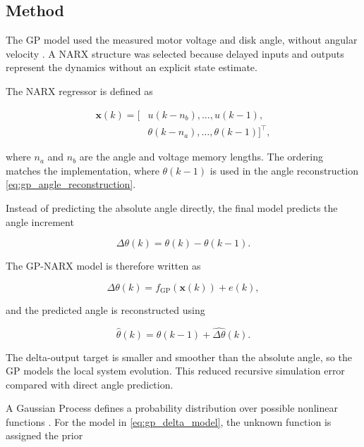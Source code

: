 

\subsection{Method}

The GP model used the measured motor voltage and disk angle, without
angular velocity \cite{assignment5sc28}. A NARX structure was selected
because delayed inputs and outputs represent the dynamics without an
explicit state estimate.

The NARX regressor is defined as

\begin{equation}
\begin{aligned}
\mathbf{x}(k) =
\big[&
u(k-n_b),\ldots,u(k-1),\\
&
\theta(k-n_a),\ldots,\theta(k-1)
\big]^{\top},
\end{aligned}
\label{eq:gp_regressor}
\end{equation}

where \(n_a\) and \(n_b\) are the angle and voltage memory lengths. The
ordering matches the implementation, where \(\theta(k-1)\) is used in
the angle reconstruction \eqref{eq:gp_angle_reconstruction}.

Instead of predicting the absolute angle directly, the final model
predicts the angle increment

\begin{equation}
\Delta\theta(k)=\theta(k)-\theta(k-1).
\label{eq:gp_delta_target}
\end{equation}

The GP-NARX model is therefore written as

\begin{equation}
\Delta\theta(k)
=
f_{\mathrm{GP}}\!\left(\mathbf{x}(k)\right)+e(k),
\label{eq:gp_delta_model}
\end{equation}

and the predicted angle is reconstructed using

\begin{equation}
\hat{\theta}(k)
=
\theta(k-1)+\widehat{\Delta\theta}(k).
\label{eq:gp_angle_reconstruction}
\end{equation}

The delta-output target is smaller and smoother than the absolute angle,
so the GP models the local system evolution. This reduced recursive
simulation error compared with direct angle prediction.

A Gaussian Process defines a probability distribution over possible
nonlinear functions \cite{course5sc28}. For the model in
\eqref{eq:gp_delta_model}, the unknown function is assigned the prior

